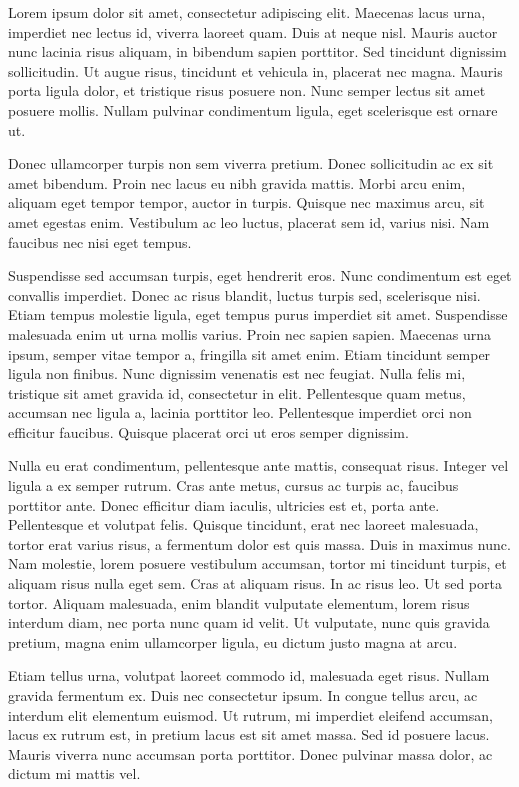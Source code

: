 Lorem ipsum dolor sit amet, consectetur adipiscing elit. Maecenas lacus urna, imperdiet nec lectus id, viverra laoreet quam. Duis at neque nisl. Mauris auctor nunc lacinia risus aliquam, in bibendum sapien porttitor. Sed tincidunt dignissim sollicitudin. Ut augue risus, tincidunt et vehicula in, placerat nec magna. Mauris porta ligula dolor, et tristique risus posuere non. Nunc semper lectus sit amet posuere mollis. Nullam pulvinar condimentum ligula, eget scelerisque est ornare ut. 

Donec ullamcorper turpis non sem viverra pretium. Donec sollicitudin ac ex sit amet bibendum. Proin nec lacus eu nibh gravida mattis. Morbi arcu enim, aliquam eget tempor tempor, auctor in turpis. Quisque nec maximus arcu, sit amet egestas enim. Vestibulum ac leo luctus, placerat sem id, varius nisi. Nam faucibus nec nisi eget tempus. 

Suspendisse sed accumsan turpis, eget hendrerit eros. Nunc condimentum est eget convallis imperdiet. Donec ac risus blandit, luctus turpis sed, scelerisque nisi. Etiam tempus molestie ligula, eget tempus purus imperdiet sit amet. Suspendisse malesuada enim ut urna mollis varius. Proin nec sapien sapien. Maecenas urna ipsum, semper vitae tempor a, fringilla sit amet enim. Etiam tincidunt semper ligula non finibus. Nunc dignissim venenatis est nec feugiat. Nulla felis mi, tristique sit amet gravida id, consectetur in elit. Pellentesque quam metus, accumsan nec ligula a, lacinia porttitor leo. Pellentesque imperdiet orci non efficitur faucibus. Quisque placerat orci ut eros semper dignissim. 

Nulla eu erat condimentum, pellentesque ante mattis, consequat risus. Integer vel ligula a ex semper rutrum. Cras ante metus, cursus ac turpis ac, faucibus porttitor ante. Donec efficitur diam iaculis, ultricies est et, porta ante. Pellentesque et volutpat felis. Quisque tincidunt, erat nec laoreet malesuada, tortor erat varius risus, a fermentum dolor est quis massa. Duis in maximus nunc. Nam molestie, lorem posuere vestibulum accumsan, tortor mi tincidunt turpis, et aliquam risus nulla eget sem. Cras at aliquam risus. In ac risus leo. Ut sed porta tortor. Aliquam malesuada, enim blandit vulputate elementum, lorem risus interdum diam, nec porta nunc quam id velit. Ut vulputate, nunc quis gravida pretium, magna enim ullamcorper ligula, eu dictum justo magna at arcu. 

Etiam tellus urna, volutpat laoreet commodo id, malesuada eget risus. Nullam gravida fermentum ex. Duis nec consectetur ipsum. In congue tellus arcu, ac interdum elit elementum euismod. Ut rutrum, mi imperdiet eleifend accumsan, lacus ex rutrum est, in pretium lacus est sit amet massa. Sed id posuere lacus. Mauris viverra nunc accumsan porta porttitor. Donec pulvinar massa dolor, ac dictum mi mattis vel. 

